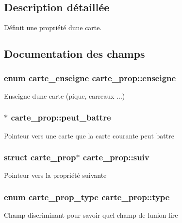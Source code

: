 \subsection{Description détaillée}
Définit une propriété d\textquotesingle{}une carte. 

\subsection{Documentation des champs}
\subsubsection[{\texorpdfstring{enseigne}{enseigne}}]{\setlength{\rightskip}{0pt plus 5cm}enum {\bf carte\+\_\+enseigne} carte\+\_\+prop\+::enseigne}\hypertarget{structcarte__prop_aa01631e22730e71acdae17bec74fcdd3}{}\label{structcarte__prop_aa01631e22730e71acdae17bec74fcdd3}
Enseigne d\textquotesingle{}une carte (pique, carreaux ...) 
\subsubsection[{\texorpdfstring{peut\+\_\+battre}{peut_battre}}]{$\ast$ carte\+\_\+prop\+::peut\+\_\+battre}\hypertarget{structcarte__prop_a23cb7c2805cd6c447786465937cb0255}{}\label{structcarte__prop_a23cb7c2805cd6c447786465937cb0255}
Pointeur vers une carte que la carte courante peut battre 
\subsubsection[{\texorpdfstring{suiv}{suiv}}]{\setlength{\rightskip}{0pt plus 5cm}struct {\bf carte\+\_\+prop}$\ast$ carte\+\_\+prop\+::suiv}\hypertarget{structcarte__prop_a0cb42544111674aa11728c2b7392a661}{}\label{structcarte__prop_a0cb42544111674aa11728c2b7392a661}
Pointeur vers la propriété suivante 
\subsubsection[{\texorpdfstring{type}{type}}]{\setlength{\rightskip}{0pt plus 5cm}enum {\bf carte\+\_\+prop\+\_\+type} carte\+\_\+prop\+::type}\hypertarget{structcarte__prop_a434a5fe3ac234b8886126c4ea9acf243}{}\label{structcarte__prop_a434a5fe3ac234b8886126c4ea9acf243}
Champ discriminant pour savoir quel champ de l\textquotesingle{}union lire 
